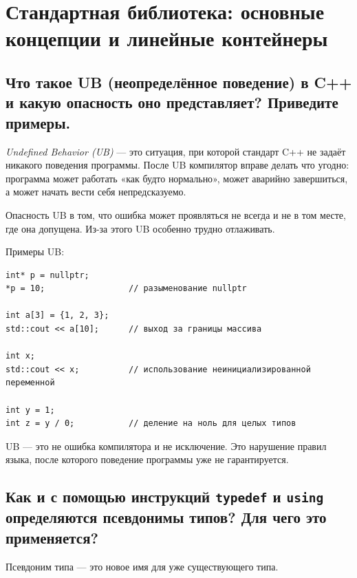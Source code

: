\section{Стандартная библиотека: основные концепции и линейные контейнеры}

\subsection{Что такое UB (неопределённое поведение) в C++ и какую опасность оно представляет? Приведите примеры.}
\begin{definition}[UB]
\textit{Undefined Behavior (UB)} — это ситуация, при которой стандарт C++ не задаёт никакого поведения программы. После UB компилятор вправе делать что угодно: программа может работать «как будто нормально», может аварийно завершиться, а может начать вести себя непредсказуемо.
\end{definition}

Опасность UB в том, что ошибка может проявляться не всегда и не в том месте, где она допущена. Из-за этого UB особенно трудно отлаживать.

\begin{example}
Примеры UB:
\begin{verbatim}
int* p = nullptr;
*p = 10;                 // разыменование nullptr

int a[3] = {1, 2, 3};
std::cout << a[10];      // выход за границы массива

int x;
std::cout << x;          // использование неинициализированной переменной

int y = 1;
int z = y / 0;           // деление на ноль для целых типов
\end{verbatim}
\end{example}

\begin{remark}
UB — это не ошибка компилятора и не исключение. Это нарушение правил языка, после которого поведение программы уже не гарантируется.
\end{remark}

\subsection{Как и с помощью инструкций \texttt{typedef} и \texttt{using} определяются псевдонимы типов? Для чего это применяется?}
\begin{definition}
Псевдоним типа — это новое имя для уже существующего типа.
\end{definition}

